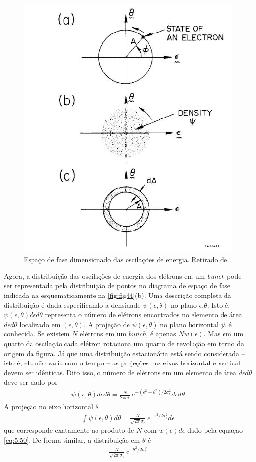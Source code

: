 \begin{figure}[!htb]
	\centering
	\includegraphics[width=0.6\linewidth]{./Figuras/fig44.jpeg}
	\caption{Espaço de fase dimensionado das oscilações de energia. Retirado de \cite{sands1970physics}.}
	\label{fig:fig44}
\end{figure}

Agora, a distribuição das oscilações de energia dos elétrons em um \textit{bunch} pode ser representada pela distribuição de pontos no diagrama de espaço de fase indicada na esquematicamente na \autoref{fig:fig44}(b). Uma descrição completa da distribuição é dada especificando a densidade $\psi(\epsilon,\theta)$ no plano $\epsilon$,$\theta$. Isto é, $\psi(\epsilon,\theta)d\epsilon d\theta$ representa o número de elétrons encontrados no elemento de área $d\epsilon d\theta$ localizado em $(\epsilon,\theta)$. A projeção de $\psi(\epsilon,\theta)$ no plano horizontal já é conhecida. Se existem $N$ elétrons em um \textit{bunch}, é apenas $Nw(\epsilon)$. Mas em um quarto da oscilação cada elétron rotaciona um quarto de revolução em torno da origem da figura. Já que uma distribuição estacionária está sendo considerada -- isto é, ela não varia com o tempo -- as projeções nos eixos horizontal e vertical devem ser idênticas. Dito isso, o número de elétrons em um elemento de área $d\epsilon d\theta$ deve ser dado por
\begin{align}
	\psi(\epsilon,\theta)d\epsilon d\theta = \frac{N}{2\pi \sigma_\epsilon^2}\ e^{-(\epsilon^2+\theta^2)/2\sigma_\epsilon^2}d\epsilon d\theta\label{eq:5.57}
\end{align}
A projeção no eixo horizontal é
\begin{align*}
	\int \psi(\epsilon,\theta)d\theta = \frac{N}{\sqrt{2\pi}\sigma_\epsilon}\ e^{-\epsilon^2/2\sigma_\epsilon^2}d\epsilon
\end{align*}
que corresponde exatamente ao produto de $N$ com $w(\epsilon)d\epsilon$ dado pela equação \eqref{eq:5.50}. De forma similar, a distribuição em $\theta$ é
\begin{align}
	\frac{N}{\sqrt{2\pi}\sigma_\epsilon}\ e^{-\theta^2/2\sigma_\epsilon^2}
\end{align}

